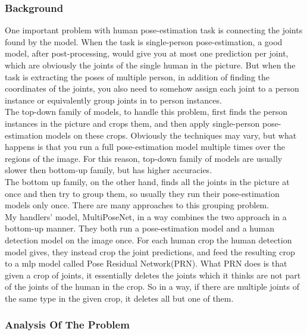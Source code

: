 \documentclass[titlepage, a4paper, 14pt]{extarticle} %
\begin{document}
\subsubsection{Background} \label{bg}

One important problem with human pose-estimation task is connecting the joints found by the model. When the task is single-person pose-estimation, a good model, after post-processing, would give you at most one prediction per joint, which are obviously the joints of the single human in the picture. But when the task is extracting the poses of multiple person, in addition of finding the coordinates of the joints, you also need to somehow assign each joint to a person instance or equivalently group joints in to person instances. \\

The top-down family of models, to handle this problem, first finds the person instances in the picture and crops them, and then apply single-person pose-estimation models on these crops. Obviously the techniques may vary, but what happens is that you run a full pose-estimation model multiple times over the regions of the image. For this reason, top-down family of models are usually slower then bottom-up family, but has higher accuracies. \\

The bottom up family, on the other hand, finds all the joints in the picture at once and then try to group them, so usually they run their pose-estimation models only once. There are many approaches to this grouping problem. \\

My handlers' model, MultiPoseNet, in a way combines the two approach in a bottom-up manner. They both run a pose-estimation model and a human detection model on the image once. For each human crop the human detection model gives, they instead crop the joint predictions, and feed the resulting crop to a mlp model called Pose Residual Network(PRN).  What PRN does is that given a crop of joints, it essentially deletes the joints which it thinks are not part of the joints of the human in the crop. So in a way, if there are multiple joints of the same type in the given crop, it deletes all but one of them. \\

\subsubsection{Analysis Of The Problem} \label{ana}
\end{document}

